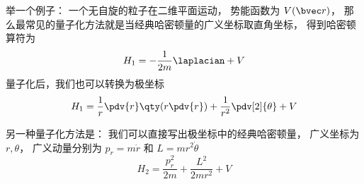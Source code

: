 
举一个例子： 一个无自旋的粒子在二维平面运动， 势能函数为 $V(\bvec r)$， 那么最常见的量子化方法就是当经典哈密顿量的广义坐标取直角坐标， 得到哈密顿算符为
\begin{equation}
H_1 = -\frac{1}{2m} \laplacian + V
\end{equation}
量子化后，我们也可以转换为极坐标
\begin{equation}
H_1 = \frac{1}{r}\pdv{r}\qty(r \pdv{r}) + \frac{1}{r^2} \pdv[2]{\theta} + V
\end{equation}

另一种量子化方法是： 我们可以直接写出极坐标中的经典哈密顿量， 广义坐标为 $r, \theta$， 广义动量分别为 $p_r = m\dot r$ 和 $L = mr^2\dot\theta$
\begin{equation}
H_2 = \frac{p_r^2}{2m} + \frac{L^2}{2mr^2} + V
\end{equation}
